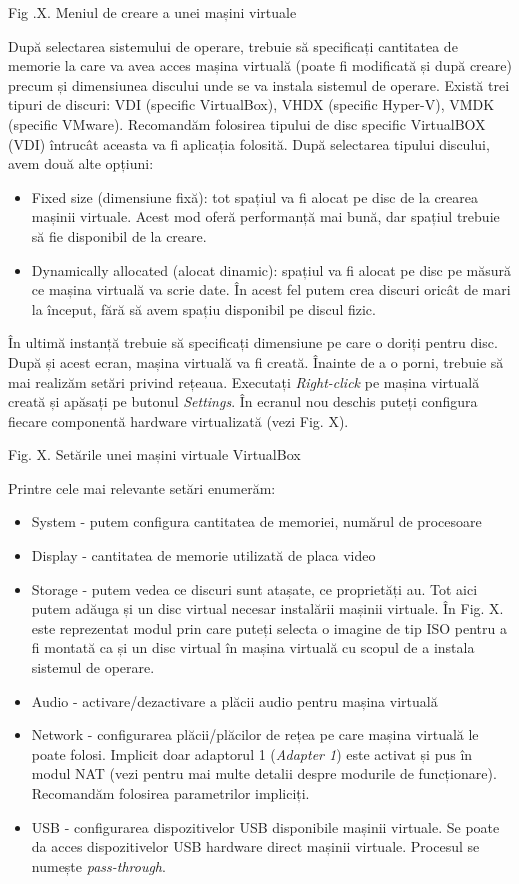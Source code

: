 Fig .X. Meniul de creare a unei mașini virtuale

După selectarea sistemului de operare, trebuie să specificați cantitatea de
memorie la care va avea acces mașina virtuală (poate fi modificată și după
creare) precum și dimensiunea discului unde se va instala sistemul de operare.
Există trei tipuri de discuri: VDI (specific VirtualBox), VHDX (specific
Hyper-V), VMDK (specific VMware). Recomandăm folosirea tipului de disc specific
VirtualBOX (VDI) întrucât aceasta va fi aplicația folosită. După selectarea
tipului discului, avem două alte opțiuni:

\begin{itemize}
	\item Fixed size (dimensiune fixă): tot spațiul va fi alocat pe disc de
		la crearea mașinii virtuale. Acest mod oferă performanță mai
		bună, dar spațiul trebuie să fie disponibil de la creare.
	\item Dynamically allocated (alocat dinamic): spațiul va fi alocat pe
		disc pe măsură ce mașina virtuală va scrie date. În acest fel
		putem crea discuri oricât de mari la început, fără să avem
		spațiu disponibil pe discul fizic.
\end{itemize}

În ultimă instanță trebuie să specificați dimensiune pe care o doriți pentru
disc. După și acest ecran, mașina virtuală va fi creată. Înainte de a o porni,
trebuie să mai realizăm setări privind rețeaua. Executați \textit{Right-click}
pe mașina virtuală creată și apăsați pe butonul \textit{Settings}. În ecranul
nou deschis puteți configura fiecare componentă hardware virtualizată (vezi Fig.
X).

Fig. X. Setările unei mașini virtuale VirtualBox

Printre cele mai relevante setări enumerăm:

\begin{itemize}
	\item System - putem configura cantitatea de memoriei, numărul de
		procesoare
	\item Display - cantitatea de memorie utilizată de placa video
	\item Storage - putem vedea ce discuri sunt atașate, ce proprietăți au.
		Tot aici putem adăuga și un disc virtual necesar instalării
		mașinii virtuale. În Fig. X. este reprezentat modul prin care
		puteți selecta o imagine de tip ISO pentru a fi montată ca și un
		disc virtual în mașina virtuală cu scopul de a instala sistemul
		de operare.
	\item Audio - activare/dezactivare a plăcii audio pentru mașina virtuală
	\item Network - configurarea plăcii/plăcilor de rețea pe care mașina
		virtuală le poate folosi. Implicit doar adaptorul 1
		(\textit{Adapter 1}) este activat și pus în modul NAT (vezi
		 pentru mai multe
		detalii despre modurile de funcționare). Recomandăm folosirea
		parametrilor impliciți.
	\item USB - configurarea dispozitivelor USB disponibile mașinii
		virtuale. Se poate da acces dispozitivelor USB hardware direct
		mașinii virtuale. Procesul se numește \textit{pass-through}.
\end{itemize}

